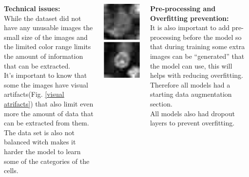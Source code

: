\documentclass[25pt, a0paper, portrait]{tikzposter}
\begin{document}
\begin{columns}
{		\textbf{Technical issues:}\\
		While the dataset did not have any unusable images the small size of the images and the limited color range 
		limits the amount of information that can be extracted.\\
		It's important to know that some the images have visual artifacts(Fig. \ref{visual atrifacts}) that also limit 
		even more the amount of data that can be extracted from them.\\
		The data set is also not balanced witch makes it harder the model to learn some of the categories of the cells.
		\bigskip

		\begin{tikzfigure}
			\label{visual atrifacts}
			\includegraphics[width=.2\linewidth]{figures/wierd_image_1.png}
			\includegraphics[width=.2\linewidth]{figures/wierd_image_2.png}
		\end{tikzfigure}

		\bigskip
		\textbf {Pre-processing and Overfitting prevention:}\\
		It is also important to add pre-processing before the model so that during training some extra images can be 
		``generated'' that the model can use, this will helps with reducing overfitting.\\
		Therefore all models had a starting data augmentation section.\\
		All models also had dropout layers to prevent overfitting.

}
\end{columns}
\end{document}

